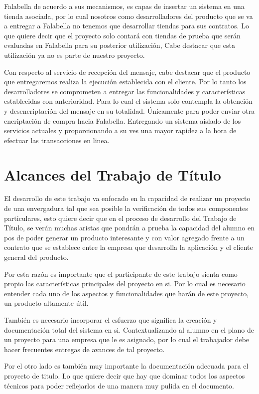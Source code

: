 \documentclass[a4paper,12pt,openany,oneside]{book}
\begin{document}
Falabella de acuerdo a sus mecanismos, es capas de insertar un sistema en una tienda asociada, por lo cual nosotros como desarrolladores del producto que se va a entregar a Falabella no tenemos que desarrollar tiendas para sus contratos. Lo que quiere decir que el proyecto solo contará con tiendas de prueba que serán evaluadas en Falabella para su posterior utilización, Cabe destacar que esta utilización ya no es parte de nuestro proyecto.

Con respecto al servicio de recepción del mensaje, cabe destacar que el producto que entregaremos realiza la ejecución establecida con el cliente. Por lo tanto los desarrolladores se comprometen a entregar las funcionalidades y características establecidas con anterioridad. Para lo cual el sistema solo contempla la obtención y desencriptación del mensaje en su totalidad. Únicamente para poder enviar otra encriptación de compra hacia Falabella. Entregando un sistema aislado de los servicios actuales y proporcionando a su ves una mayor rapidez a la hora de efectuar las transacciones en linea.
\section{Alcances del Trabajo de Título}
El desarrollo de este trabajo va enfocado en la capacidad de realizar un proyecto de una envergadura tal que sea posible la verificación de todos sus componentes particulares, esto quiere decir que en el proceso de desarrollo del Trabajo de Título, se verán muchas aristas que pondrán a prueba la capacidad del alumno en pos de poder generar un producto interesante y con valor agregado frente a un contrato que se establece entre la empresa que desarrolla la aplicación y el cliente general del producto.

Por esta razón es importante que el participante de este trabajo sienta como propio las características principales del proyecto en si. Por lo cual es necesario entender cada uno de los aspectos y funcionalidades que harán de este proyecto, un producto altamente útil.

También es necesario incorporar el esfuerzo que significa la creación y documentación total del sistema en si. Contextualizando al alumno en el plano de un proyecto para una empresa que le es asignado, por lo cual el trabajador debe hacer frecuentes entregas de avances de tal proyecto.

Por el otro lado es también muy importante la documentación adecuada para el proyecto de titulo. Lo que quiere decir que hay que dominar todos los aspectos técnicos para poder reflejarlos de una manera muy pulida en el documento.
\end{document}
